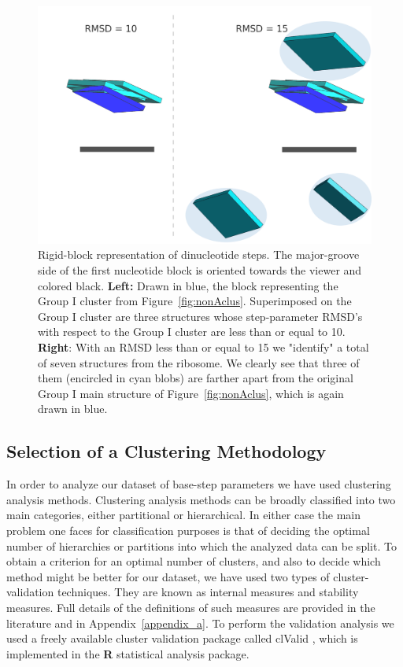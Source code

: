 \begin{figure}[htp]
 \centering
\includegraphics[angle=0, scale=1.5]{Chapter2/G1at10_15b.png}
\caption{Rigid-block   representation  of  dinucleotide   steps.   The
  major-groove side of the  first nucleotide block is oriented towards
  the  viewer and colored  black.  \textbf{Left:}  Drawn in  blue, the
  block     representing     the      Group     I     cluster     from
  Figure~\ref{fig:nonAclus}. Superimposed  on the Group  I cluster are
  three  structures whose  step-parameter RMSD's  with respect  to the
  Group I cluster  are less than or equal  to 10. \textbf{Right}: With
  an RMSD  less than  or equal to  15 we  "identify" a total  of seven
  structures  from the  ribosome. We  clearly see  that three  of them
  (encircled in cyan blobs) are  farther apart from the original Group
  I main structure of  Figure~\ref{fig:nonAclus}, which is again drawn
  in blue.}
 \label{fig:superimpose}
\end{figure}

\subsection{Selection of a Clustering Methodology}
In order to  analyze our dataset of base-step  parameters we have used
clustering  analysis  methods.   Clustering  analysis methods  can  be
broadly  classified into  two main  categories, either  partitional or
hierarchical.   In  either  case   the  main  problem  one  faces  for
classification  purposes is  that of  deciding the  optimal  number of
hierarchies or partitions  into which the analyzed data  can be split.
To obtain a  criterion for an optimal number of  clusters, and also to
decide which method might be better  for our dataset, we have used two
types of  cluster-validation techniques.   They are known  as internal
measures and  stability measures.  Full details of  the definitions of
such  measures   are  provided  in   the  literature  \cite{handl2005,
  brock2008}  and in  Appendix~\ref{appendix_a}.   To perform  the
validation  analysis we  used  a freely  available cluster  validation
package called  clValid \cite{brock2008}, which is  implemented in the
\textbf{R} \cite{rcite} statistical analysis package.

